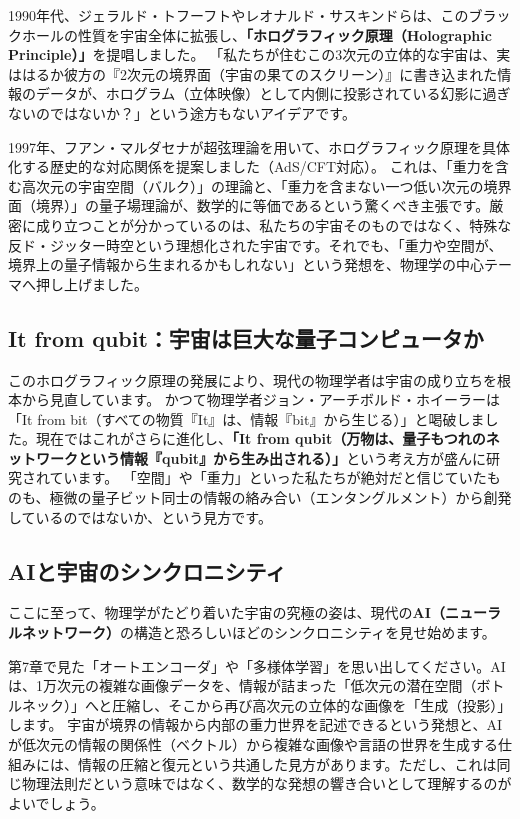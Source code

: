 1990年代、ジェラルド・トフーフトやレオナルド・サスキンドらは、このブラックホールの性質を宇宙全体に拡張し、\textbf{「ホログラフィック原理（Holographic Principle）」}を提唱しました。 「私たちが住むこの3次元の立体的な宇宙は、実ははるか彼方の『2次元の境界面（宇宙の果てのスクリーン）』に書き込まれた情報のデータが、ホログラム（立体映像）として内側に投影されている幻影に過ぎないのではないか？」という途方もないアイデアです。

1997年、フアン・マルダセナが超弦理論を用いて、ホログラフィック原理を具体化する歴史的な対応関係を提案しました（AdS/CFT対応）。 これは、「重力を含む高次元の宇宙空間（バルク）」の理論と、「重力を含まない一つ低い次元の境界面（境界）」の量子場理論が、数学的に等価であるという驚くべき主張です。厳密に成り立つことが分かっているのは、私たちの宇宙そのものではなく、特殊な反ド・ジッター時空という理想化された宇宙です。それでも、「重力や空間が、境界上の量子情報から生まれるかもしれない」という発想を、物理学の中心テーマへ押し上げました。

\subsection{It from qubit：宇宙は巨大な量子コンピュータか}

このホログラフィック原理の発展により、現代の物理学者は宇宙の成り立ちを根本から見直しています。 かつて物理学者ジョン・アーチボルド・ホイーラーは「It from bit（すべての物質『It』は、情報『bit』から生じる）」と喝破しました。現在ではこれがさらに進化し、\textbf{「It from qubit（万物は、量子もつれのネットワークという情報『qubit』から生み出される）」}という考え方が盛んに研究されています。 「空間」や「重力」といった私たちが絶対だと信じていたものも、極微の量子ビット同士の情報の絡み合い（エンタングルメント）から創発しているのではないか、という見方です。

\subsection{AIと宇宙のシンクロニシティ}

ここに至って、物理学がたどり着いた宇宙の究極の姿は、現代の\textbf{AI（ニューラルネットワーク）}の構造と恐ろしいほどのシンクロニシティを見せ始めます。

第7章で見た「オートエンコーダ」や「多様体学習」を思い出してください。AIは、1万次元の複雑な画像データを、情報が詰まった「低次元の潜在空間（ボトルネック）」へと圧縮し、そこから再び高次元の立体的な画像を「生成（投影）」します。 宇宙が境界の情報から内部の重力世界を記述できるという発想と、AIが低次元の情報の関係性（ベクトル）から複雑な画像や言語の世界を生成する仕組みには、情報の圧縮と復元という共通した見方があります。ただし、これは同じ物理法則だという意味ではなく、数学的な発想の響き合いとして理解するのがよいでしょう。

